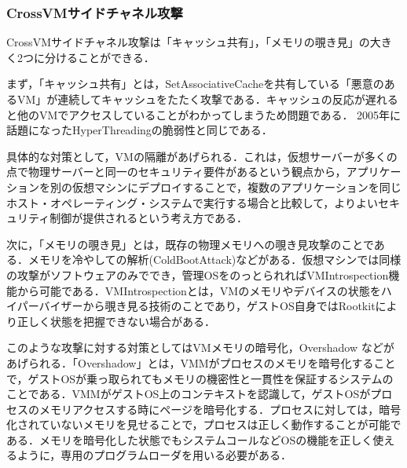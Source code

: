 \subsubsection{CrossVMサイドチャネル攻撃}
CrossVMサイドチャネル攻撃は「キャッシュ共有」，「メモリの覗き見」の大きく2つに分けることができる\cite{vmsec}．\par 
まず，「キャッシュ共有」とは，SetAssociativeCacheを共有している「悪意のあるVM」が連続してキャッシュをたたく攻撃である．キャッシュの反応が遅れると他のVMでアクセスしていることがわかってしまうため問題である．
2005年に話題になったHyperThreadingの脆弱性と同じである．\par
具体的な対策として，VMの隔離があげられる．これは，仮想サーバーが多くの点で物理サーバーと同一のセキュリティ要件があるという観点から，アプリケーションを別の仮想マシンにデプロイすることで，複数のアプリケーションを同じホスト・オペレーティング・システムで実行する場合と比較して，よりよいセキュリティ制御が提供されるという考え方である．\par 
次に，「メモリの覗き見」とは，既存の物理メモリへの覗き見攻撃のことである．メモリを冷やしての解析(ColdBootAttack)などがある．仮想マシンでは同様の攻撃がソフトウェアのみででき，管理OSをのっとられればVMIntrospection機能から可能である．VMIntrospectionとは，VMのメモリやデバイスの状態をハイパーバイザーから覗き見る技術のことであり，ゲストOS自身ではRootkitにより正しく状態を把握できない場合がある．\par
このような攻撃に対する対策としてはVMメモリの暗号化，Overshadow
などがあげられる．「Overshadow」とは，VMMがプロセスのメモリを暗号化することで，ゲストOSが乗っ取られてもメモリの機密性と一貫性を保証するシステムのことである\cite{chen2008}．VMMがゲストOS上のコンテキストを認識して，ゲストOSがプロセスのメモリアクセスする時にページを暗号化する．プロセスに対しては，暗号化されていないメモリを見せることで，プロセスは正しく動作することが可能である．メモリを暗号化した状態でもシステムコールなどOSの機能を正しく使えるように，専用のプログラムローダを用いる必要がある．\par
